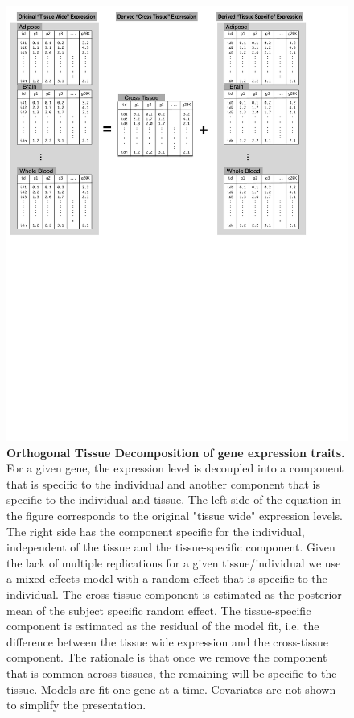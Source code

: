 \documentclass[10pt,letterpaper]{article}
\begin{document}
\begin{figure}[H]
\includegraphics[width=\textwidth]{Figures/OTD.pdf}
\caption{\textbf{Orthogonal Tissue Decomposition of gene expression traits.} For a given gene, the expression level is decoupled into a component that is specific to the individual and another component that is specific to the individual and tissue. The left side of the equation in the figure corresponds to the original "tissue wide" expression levels. The right side has the component specific for the individual, independent of the tissue and the tissue-specific component. Given the lack of multiple replications for a given tissue/individual we use a mixed effects model with a random effect that is specific to the individual. The cross-tissue component is estimated as the posterior mean of the subject specific random effect. The tissue-specific component is estimated as the residual of the model fit, i.e. the difference between the tissue wide expression and the cross-tissue component. The rationale is that once we remove the component that is common across tissues, the remaining will be specific to the tissue. Models are fit one gene at a time. Covariates are not shown to simplify the presentation.}
\label{fig-OTD}
\end{figure}
\end{document}
